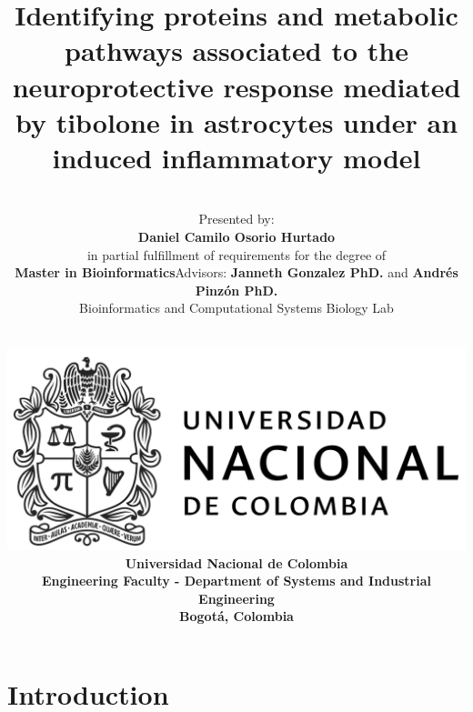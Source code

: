 \documentclass[11pt]{beamer}
\author[Daniel Osorio]{\vspace*{-0.55cm}\\\normalsize{\scriptsize{Presented by:}\\\normalsize{\textbf{Daniel Camilo Osorio Hurtado}}}\\\scriptsize{in partial fulfillment of requirements for the degree of} \normalsize{\\\textbf{Master in Bioinformatics}\newline \newline Advisors: \textbf{Janneth Gonzalez PhD.} and \textbf{Andrés Pinzón PhD.}}\\\scriptsize{Bioinformatics and Computational Systems Biology Lab}}
\title[Bioinformatics Master Thesis]{Identifying proteins and metabolic pathways associated to the neuroprotective response mediated by tibolone in astrocytes under an induced inflammatory model}
\date[]{\scriptsize{\vspace{-1.1cm}\\\includegraphics[scale=.2]{UN}\\\textbf{Universidad Nacional de Colombia\\ Engineering Faculty - Department of Systems and Industrial Engineering\\Bogotá, Colombia}}}
\begin{document}
\maketitle
\section{Introduction}
\end{document}
